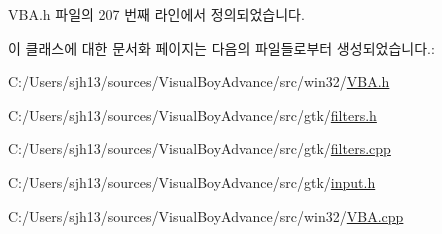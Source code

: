 V\+B\+A.\+h 파일의 207 번째 라인에서 정의되었습니다.



이 클래스에 대한 문서화 페이지는 다음의 파일들로부터 생성되었습니다.\+:\begin{DoxyCompactItemize}
\item 
C\+:/\+Users/sjh13/sources/\+Visual\+Boy\+Advance/src/win32/\mbox{\hyperlink{_v_b_a_8h}{V\+B\+A.\+h}}\item 
C\+:/\+Users/sjh13/sources/\+Visual\+Boy\+Advance/src/gtk/\mbox{\hyperlink{filters_8h}{filters.\+h}}\item 
C\+:/\+Users/sjh13/sources/\+Visual\+Boy\+Advance/src/gtk/\mbox{\hyperlink{filters_8cpp}{filters.\+cpp}}\item 
C\+:/\+Users/sjh13/sources/\+Visual\+Boy\+Advance/src/gtk/\mbox{\hyperlink{gtk_2input_8h}{input.\+h}}\item 
C\+:/\+Users/sjh13/sources/\+Visual\+Boy\+Advance/src/win32/\mbox{\hyperlink{_v_b_a_8cpp}{V\+B\+A.\+cpp}}\end{DoxyCompactItemize}
